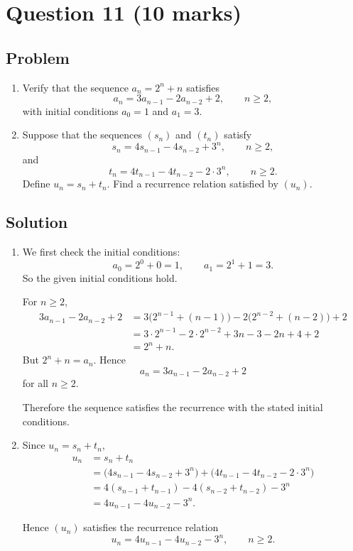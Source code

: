 \documentclass[12pt]{article}
\begin{document}
\newpage
\section{Question 11 \hfill (10 marks)}
\subsection{Problem}

\begin{enumerate}[label=(\alph*)]
    \item Verify that the sequence $a_n=2^n+n$ satisfies
    \[
    a_n=3a_{n-1}-2a_{n-2}+2,\qquad n\ge 2,
    \]
    with initial conditions $a_0=1$ and $a_1=3$.
    \item Suppose that the sequences $(s_n)$ and $(t_n)$ satisfy
    \[
    s_n=4s_{n-1}-4s_{n-2}+3^n,\qquad n\ge 2,
    \]
    and
    \[
    t_n=4t_{n-1}-4t_{n-2}-2\cdot 3^n,\qquad n\ge 2.
    \]
    Define $u_n=s_n+t_n$. Find a recurrence relation satisfied by $(u_n)$.
\end{enumerate}

\subsection{Solution}

\begin{enumerate}[label=(\alph*)]
    \item We first check the initial conditions:
    \[
    a_0=2^0+0=1,
    \qquad
    a_1=2^1+1=3.
    \]
    So the given initial conditions hold.

    For $n\ge 2$,
    \begin{align*}
    3a_{n-1}-2a_{n-2}+2
    &=3\bigl(2^{n-1}+(n-1)\bigr)-2\bigl(2^{n-2}+(n-2)\bigr)+2 \\
    &=3\cdot 2^{n-1}-2\cdot 2^{n-2}+3n-3-2n+4+2 \\
    &=2^n+n.
    \end{align*}
    But $2^n+n=a_n$. Hence
    \[
    a_n=3a_{n-1}-2a_{n-2}+2
    \]
    for all $n\ge 2$.

    Therefore the sequence satisfies the recurrence with the stated initial conditions.

    \item Since $u_n=s_n+t_n$,
    \begin{align*}
    u_n
    &=s_n+t_n \\
    &=\bigl(4s_{n-1}-4s_{n-2}+3^n\bigr)+\bigl(4t_{n-1}-4t_{n-2}-2\cdot 3^n\bigr) \\
    &=4(s_{n-1}+t_{n-1})-4(s_{n-2}+t_{n-2})-3^n \\
    &=4u_{n-1}-4u_{n-2}-3^n.
    \end{align*}

    Hence $(u_n)$ satisfies the recurrence relation
    \[
    \boxed{u_n=4u_{n-1}-4u_{n-2}-3^n,\qquad n\ge 2.}
    \]
\end{enumerate}
\end{document}
